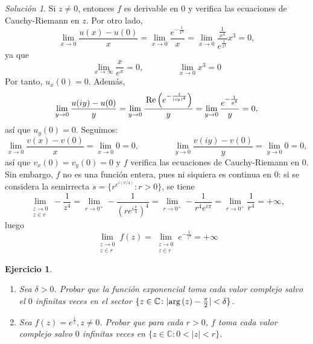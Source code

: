 \documentclass[11pt]{report}
\newcommand{\C}{\mathbb C}
\newcommand{\pars}[1]{\left( #1 \right)} %
\renewcommand{\Re}[1]{\,\textup{Re}\pars{#1}}
\newtheorem{exercise}{Ejercicio}
\theoremstyle{remark}
\newtheorem*{resolution}{Solución}
\begin{document}
\begin{resolution}
Si $z \neq 0$, entonces $f$ es derivable en 0 y verifica las ecuaciones de Cauchy-Riemann en $z$. Por otro lado,
\[\lim_{x \to 0} \frac{u(x)-u(0)}{x} = \lim_{x \to 0} \frac{e^{-\frac{1}{x^4}}}{x} = \lim_{x \to 0} \frac{\frac{1}{x^4}}{e^{\frac{1}{x^4}}} x^3 = 0,\]
ya que
\[\lim_{x \to \infty} \frac{x}{e^x} =0, \qquad \qquad \lim_{x \to 0} x^3 = 0\]
Por tanto, $u_x(0)=0$. Además,
\[\lim_{y \to 0}\frac{u(iy)-u(0)}{y}= \lim_{y \to 0} \frac{\Re{e^{-\frac{1}{(iy)^4}}}}{y} =  \lim_{y \to 0} \frac{e^{-\frac{1}{y^4}}}{y} =0,\]
así que $u_y(0)=0$. Seguimos:
\[\lim_{x \to 0} \frac{v(x)-v(0)}{x} = \lim_{x \to 0} 0 = 0, \qquad \qquad \lim_{y \to 0} \frac{v(iy)-v(0)}{y} = \lim_{y \to 0} 0 = 0,\]
así que $v_x(0)=v_y(0)=0$ y $f$ verifica las ecuaciones de Cauchy-Riemann en $0$. Sin embargo, $f$ no es una función entera, pues ni siquiera es continua en $0$: si se considera la semirrecta $s = \{r^{e^{i(\pi/4)}} \colon r >0\}$, se tiene
\[\lim_{\substack{z \to 0 \\ z \in r}} -\frac{1}{z^4}= \lim_{r \to 0^+} -\frac{1}{(re^{i\frac{\pi}{4}})^4} = \lim_{r \to 0^+} -\frac{1}{r^4e^{i\pi}} = \lim_{r \to 0^+}\frac{1}{r^4} = +\infty,\]
luego
\[\lim_{\substack{z \to 0 \\ z \in r}} f(z) =\lim_{\substack{z \to 0 \\ z \in r}} e^{-\frac{1}{z^4}} =+\infty\]

\end{resolution}

\begin{exercise}
\hfill
\begin{enumerate}
    \item Sea $\delta >0$. Probar que la función exponencial toma cada valor complejo salvo el $0$ infinitas veces en el sector $\{z \in \C \colon |\textup{arg}\,(z)-\frac{\pi}{2}| < \delta\}$.
    \item Sea $f(z)= e^{\frac{1}{z}}, z \neq0$. Probar que para cada $r >0$, $f$ toma cada valor complejo salvo $0$ infinitas veces en $\{z \in \C \colon 0 <|z|<r\}$.
\end{enumerate}
\end{exercise}
\end{document}
